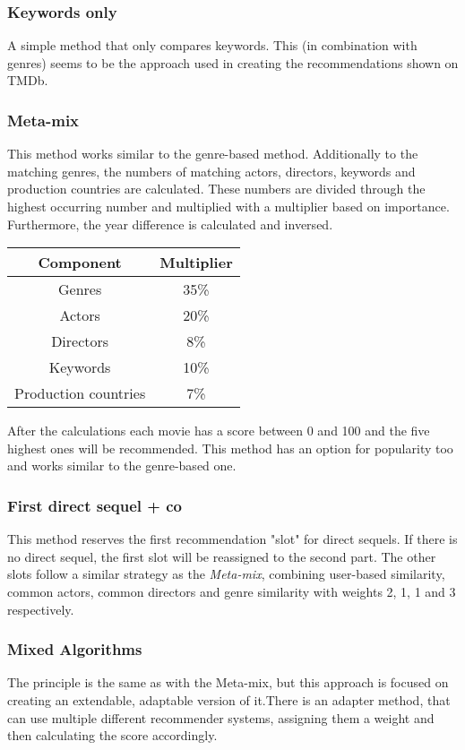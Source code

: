 \documentclass{article}
\begin{document}
\subsubsection{Keywords only}
A simple method that only compares keywords. This (in combination with genres) seems to be the approach used in creating the recommendations shown on TMDb.
\subsubsection{Meta-mix}
This method works similar to the genre-based method. Additionally to the matching genres, the numbers of matching actors, directors, keywords and production countries are calculated. These numbers are divided through the highest occurring number and multiplied with a multiplier based on importance. Furthermore, the year difference is calculated and inversed.
\begin{center}
 \begin{tabular}{||c c||} 
 \hline
 Component & Multiplier \\ [0.5ex] 
 \hline\hline
 Genres & 35\% \\ 
 \hline
 Actors & 20\% \\
 \hline
 Directors & 8\% \\
 \hline
 Keywords & 10\% \\
 \hline
 Production countries & 7\% \\ 
 \hline
\end{tabular}
\end{center}
After the calculations each movie has a score between 0 and 100 and the five highest ones will be recommended. This method has an option for popularity too and works similar to the genre-based one.
\subsubsection{First direct sequel + co}
This method reserves the first recommendation "slot" for direct sequels. If there is no direct sequel, the first slot will be reassigned to the second part. The other slots follow a similar strategy as the \emph{Meta-mix}, combining user-based similarity, common actors, common directors and genre similarity with weights 2, 1, 1 and 3 respectively.
\subsubsection{Mixed Algorithms}
The principle is the same as with the Meta-mix, but this approach is focused on creating an extendable, adaptable version of it.There is an adapter method, that can use multiple different recommender systems, assigning them a weight and then calculating the score accordingly.
\end{document}
